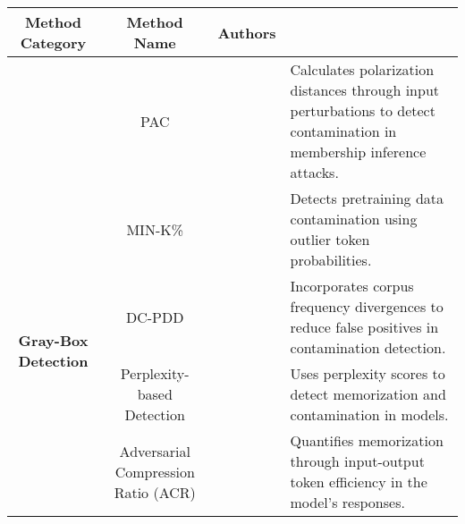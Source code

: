 \begin{tabular}{|c|c|c|>{\centering\arraybackslash}m{6.5cm}|}
\hline
\multirow{1}{*}{\textbf{Method Category}} 
& \multicolumn{1}{c|}{\textbf{Method Name}}
& \multirow{1}{*}{\textbf{Authors}} & \multirow{1}{*}{\textbf{Description}} \\
\hline

& PAC & \cite{ye-etal-2024-data} & Calculates polarization distances through input perturbations to detect contamination in membership inference attacks. \\
\cline{2-4}
& MIN-K\% & \cite{shi2024detectingpretrainingdatalarge} & Detects pretraining data contamination using outlier token probabilities. \\
\cline{2-4}
\multirow{2}{*}{\textbf{Gray-Box Detection}} 
& DC-PDD & \cite{zhang2024minkimprovedbaselinedetecting} & Incorporates corpus frequency divergences to reduce false positives in contamination detection. \\
\cline{2-4}
& Perplexity-based Detection & \cite{li2023estimatingcontaminationperplexityquantifying} & Uses perplexity scores to detect memorization and contamination in models.\\
\cline{2-4}
& Adversarial Compression Ratio (ACR) & \cite{schwarzschild2024rethinkingllmmemorizationlens} & Quantifies memorization through input-output token efficiency in the model's responses. \\
\hline
\end{tabular}
